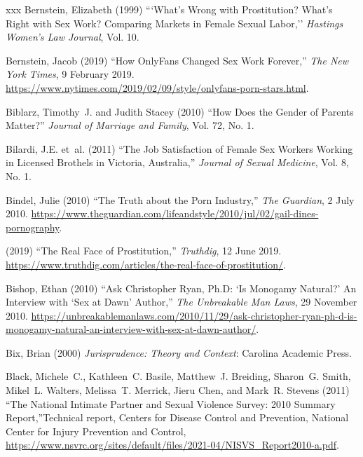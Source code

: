\documentclass[]{jlreq} \usepackage{mystyle}
\begin{document}
\begin{thebibliography}{xxx}
Bernstein, Elizabeth (1999) ```What's Wrong with Prostitution? What's Right
  with Sex Work? Comparing Markets in Female Sexual Labor,'' \textit{ Hastings
  Women's Law Journal}, Vol. 10.

Bernstein, Jacob (2019) ``How OnlyFans Changed Sex Work Forever,'' \emph{The
  New York Times}, 9 February 2019.
  \url{https://www.nytimes.com/2019/02/09/style/onlyfans-porn-stars.html}.

Biblarz, Timothy~J. and Judith Stacey (2010) ``How Does the Gender of Parents
  Matter?'' \textit{ Journal of Marriage and Family}, Vol. 72, No. 1.

Bilardi, J.E. et~al. (2011) ``The Job Satisfaction of Female Sex Workers
  Working in Licensed Brothels in Victoria, Australia,'' \textit{ Journal of
  Sexual Medicine}, Vol. 8, No. 1.

Bindel, Julie (2010) ``The Truth about the Porn Industry,'' \emph{The
  Guardian}, 2 July 2010.
  \url{https://www.theguardian.com/lifeandstyle/2010/jul/02/gail-dines-pornography}.

 \bysame{}  (2019) ``The Real Face of Prostitution,'' \emph{Truthdig}, 12 June
  2019. \url{https://www.truthdig.com/articles/the-real-face-of-prostitution/}.

Bishop, Ethan (2010) ``Ask Christopher Ryan, Ph.D: `Is Monogamy Natural?' An
  Interview with `Sex at Dawn' Author,'' \emph{The Unbreakable Man Laws}, 29
  November 2010.
  \url{https://unbreakablemanlaws.com/2010/11/29/ask-christopher-ryan-ph-d-is-monogamy-natural-an-interview-with-sex-at-dawn-author/}.

Bix, Brian (2000)  \textit{ Jurisprudence: Theory and Context}: Carolina
  Academic Press.

Black, Michele~C., Kathleen~C. Basile, Matthew~J. Breiding, Sharon~G. Smith,
  Mikel~L. Walters, Melissa~T. Merrick, Jieru Chen, and Mark~R. Stevens (2011)
  ``The National Intimate Partner and Sexual Violence Survey: 2010 Summary
  Report,''Technical report, Centers for Disease Control and Prevention,
  National Center for Injury Prevention and Control,
  \url{https://www.nsvrc.org/sites/default/files/2021-04/NISVS_Report2010-a.pdf}.


\end{thebibliography}
\end{document}
